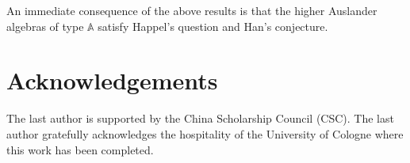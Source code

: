 \documentclass{amsart}
\newcommand{\A}{\mathbb{A}}
\theoremstyle{plain}
\theoremstyle{definition}
\numberwithin{equation}{section}
\begin{document}
An immediate consequence of the above results is that  the higher Auslander algebras of type $\A$ satisfy Happel's question and Han's conjecture.


\section*{ Acknowledgements}
The last author is supported by the China Scholarship Council (CSC). The last author gratefully acknowledges the hospitality of the University of Cologne where this work has been completed. 

\end{document}
